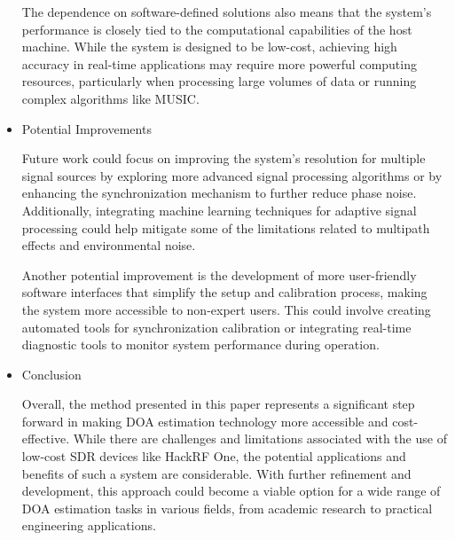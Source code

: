 \begin{itemize}
	The dependence on software-defined solutions also means that the system's performance is closely tied to the computational capabilities of the host machine. While the system is designed to be low-cost, achieving high accuracy in real-time applications may require more powerful computing resources, particularly when processing large volumes of data or running complex algorithms like MUSIC.
	
	\item {Potential Improvements}
	
	Future work could focus on improving the system's resolution for multiple signal sources by exploring more advanced signal processing algorithms or by enhancing the synchronization mechanism to further reduce phase noise. Additionally, integrating machine learning techniques for adaptive signal processing could help mitigate some of the limitations related to multipath effects and environmental noise.
	
	Another potential improvement is the development of more user-friendly software interfaces that simplify the setup and calibration process, making the system more accessible to non-expert users. This could involve creating automated tools for synchronization calibration or integrating real-time diagnostic tools to monitor system performance during operation.
	
	\item {Conclusion}
	
	Overall, the method presented in this paper represents a significant step forward in making DOA estimation technology more accessible and cost-effective. While there are challenges and limitations associated with the use of low-cost SDR devices like HackRF One, the potential applications and benefits of such a system are considerable. With further refinement and development, this approach could become a viable option for a wide range of DOA estimation tasks in various fields, from academic research to practical engineering applications.
	
\end{itemize}
